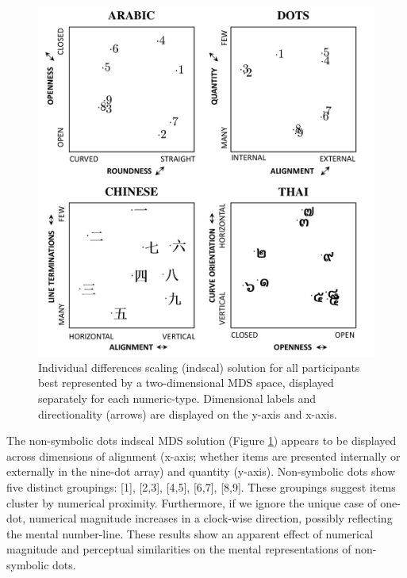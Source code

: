 \begin{figure}[tbh]
\centering \includegraphics[scale = .45]{Figures/Wheel/IndscalDescription.pdf}
\caption{Individual differences scaling (indscal) solution for all participants best represented by a two-dimensional MDS space, displayed separately for each numeric-type. Dimensional labels and directionality (arrows) are displayed on the y-axis and x-axis.}
\label{fig:Indscal}
\end{figure}

The non-symbolic dots indscal MDS solution (Figure \ref{fig:Indscal}) appears to be displayed across dimensions of alignment (x-axis; whether items are presented internally or externally in the nine-dot array) and quantity (y-axis). Non-symbolic dots show five distinct groupings: [1], [2,3], [4,5], [6,7], [8,9]. These groupings suggest items cluster by numerical proximity. Furthermore, if we ignore the unique case of one-dot, numerical magnitude increases in a clock-wise direction, possibly reflecting the mental number-line. These results show an apparent effect of numerical magnitude and perceptual similarities on the mental representations of non-symbolic dots. 

